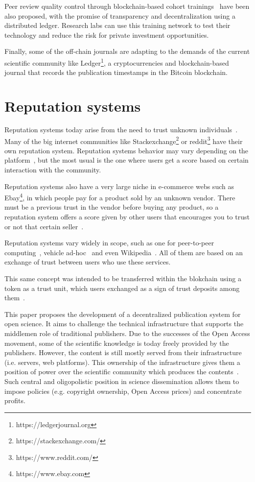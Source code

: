 Peer review quality control through blockchain-based cohort
trainings~\cite{dhillon2016bench} have been also proposed, with the promise of
transparency and decentralization using a distributed ledger. Research labs can
use this training network to test their technology and reduce the risk for
private investment opportunities.

Finally, some of the off-chain journals are adapting to the demands of the
current scientific community like Ledger\footnote{https://ledgerjournal.org}, a
cryptocurrencies and blockchain-based journal that records the publication
timestamps in the Bitcoin blockchain.

\section{Reputation systems}

Reputation systems today arise from the need to trust unknown
individuals~\cite{resnick2000reputation}. Many of the big internet communities
like Stackexchange\footnote{https://stackexchange.com/} or
reddit\footnote{https://www.reddit.com/} have their own reputation system.
Reputation systems behavior may vary depending on the
platform~\cite{josang2002beta}, but the most usual is the one where users get a score
based on certain interaction with the community.

Reputation systems also have a very large niche in e-commerce webs such as
Ebay\footnote{https://www.ebay.com}, in which people pay for a product sold by
an unknown vendor. There must be a previous trust in the vendor before buying
any product, so a reputation system offers a score given by other users that encourages you to trust
or not that certain seller~\cite{resnick2002trust}.

Reputation systems vary widely in scope, such as one for peer-to-peer
computing~\cite{zhou2007powertrust}, vehicle ad-hoc~\cite{dotzer2005vars} and
even Wikipedia~\cite{adler2007content}. All of them are based on an exchange
of trust between users who use these services.

This same concept was intended to be transferred within the blokchain using a
token as a trust unit, which users exchanged as a sign of trust
deposits among them~\cite{sharples2016blockchain}.


This paper proposes the development of a decentralized publication system for
open science. It aims to challenge the technical infrastructure that supports
the middlemen role of traditional publishers. Due to the successes of the Open
Access movement, some of the scientific knowledge is today freely provided by
the publishers. However, the content is still mostly served from their
infrastructure (i.e. servers, web platforms). This ownership of the
infrastructure gives them a position of power over the scientific community which
produces the contents~\cite{fuster2010governance}. Such central and
oligopolistic position in science dissemination allows them to impose policies
(e.g. copyright ownership, Open Access prices) and concentrate profits.

